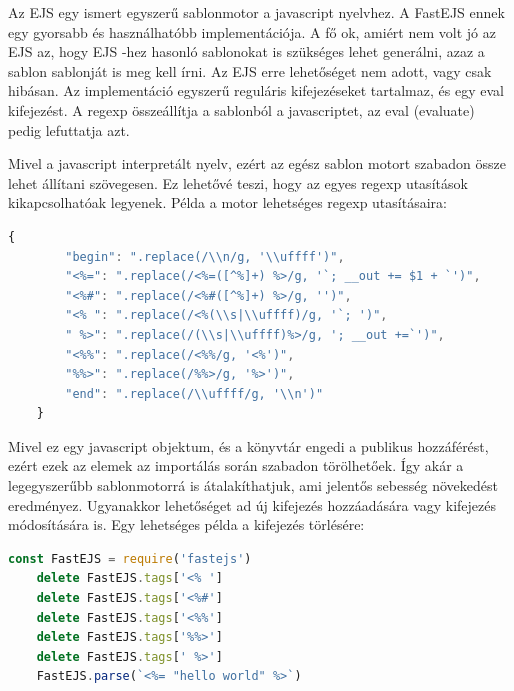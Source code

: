 \documentclass[a4paper,12pt,oneside]{report}
\begin{document}
\begin{justify}

	Az EJS egy ismert egyszerű sablonmotor a javascript nyelvhez. A FastEJS ennek egy gyorsabb és használhatóbb implementációja. A fő ok, amiért nem volt jó az EJS az, hogy EJS -hez hasonló sablonokat is szükséges lehet generálni, azaz a sablon sablonját is meg kell írni. Az EJS erre lehetőséget nem adott, vagy csak hibásan. Az implementáció egyszerű reguláris kifejezéseket tartalmaz, és egy eval kifejezést. A regexp összeállítja a sablonból a javascriptet, az eval (evaluate) pedig lefuttatja azt.

	Mivel a javascript interpretált nyelv, ezért az egész sablon motort szabadon össze lehet állítani szövegesen. Ez lehetővé teszi, hogy az egyes regexp utasítások kikapcsolhatóak legyenek. Példa a motor lehetséges regexp utasításaira:

	\begin{lstlisting}[language=javascript]
	{
		"begin": ".replace(/\\n/g, '\\uffff')",
		"<%=": ".replace(/<%=([^%]+) %>/g, '`; __out += $1 + `')",
		"<%#": ".replace(/<%#([^%]+) %>/g, '')",
		"<% ": ".replace(/<%(\\s|\\uffff)/g, '`; ')",
		" %>": ".replace(/(\\s|\\uffff)%>/g, '; __out +=`')",
		"<%%": ".replace(/<%%/g, '<%')",
		"%%>": ".replace(/%%>/g, '%>')",
		"end": ".replace(/\\uffff/g, '\\n')"
	}
	\end{lstlisting}

	Mivel ez egy javascript objektum, és a könyvtár engedi a publikus hozzáférést, ezért ezek az elemek az importálás során szabadon törölhetőek. Így akár a legegyszerűbb sablonmotorrá is átalakíthatjuk, ami jelentős sebesség növekedést eredményez. Ugyanakkor lehetőséget ad új kifejezés hozzáadására vagy kifejezés módosítására is. Egy lehetséges példa a kifejezés törlésére:

	\begin{lstlisting}[language=javascript]
	const FastEJS = require('fastejs')
	delete FastEJS.tags['<% ']
	delete FastEJS.tags['<%#']
	delete FastEJS.tags['<%%']
	delete FastEJS.tags['%%>']
	delete FastEJS.tags[' %>']
	FastEJS.parse(`<%= "hello world" %>`)
	\end{lstlisting}

\end{justify}
\end{document}
